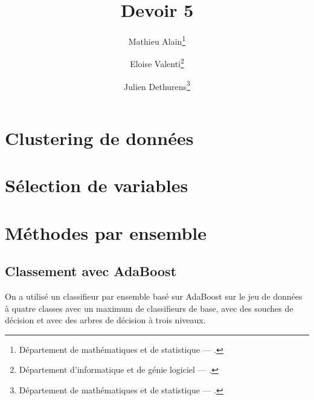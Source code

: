 \documentclass[french, twoside=semi, headings=normal]{scrartcl}
\title{Devoir 5}
\author{Mathieu Alain\thanks{Département de mathématiques et de statistique --- \mailmathieu.} \and Eloise Valenti\thanks{Département d'informatique et de génie logiciel --- \mailelo.} \and Julien Dethurens\thanks{Département de mathématiques et de statistique --- \mailjulien.}}
\begin{document}
\maketitle

\section{Clustering de données}

\section{Sélection de variables}

\section{Méthodes par ensemble}

\subsection{Classement avec AdaBoost}

On a utilisé un classifieur par ensemble basé sur AdaBoost sur le jeu de données à quatre classes avec un maximum de  classifieurs de base, avec des souches de décision et avec des arbres de décision à trois niveaux.
\end{document}
